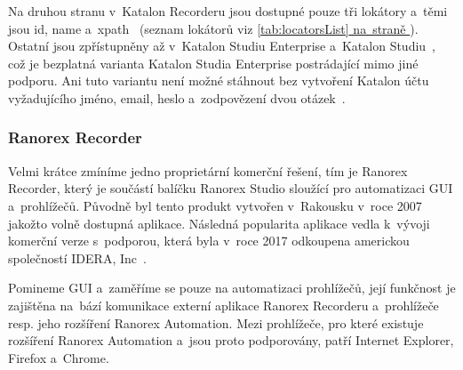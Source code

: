 \documentclass[12pt, a4paper, twoside]{article}
\newcommand{\crefAddedText}[3]{\hyperref[#1]{#2\cref{#1}#3}}
\begin{document}
	Na druhou stranu v~Katalon Recorderu jsou dostupné pouze tři lokátory a~těmi jsou id, name a~xpath~\cite{katalonRecorderVsStudio} (seznam lokátorů viz \crefAddedText{tab:locatorsList}{}{ na~straně \pageref{tab:locatorsList}}). Ostatní jsou zpřístupněny až v~Katalon Studiu Enterprise a~Katalon Studiu~\cite{katalonRecorderVsStudio}, což je bezplatná varianta Katalon Studia Enterprise postrádající mimo jiné podporu. Ani tuto variantu není možné stáhnout bez vytvoření Katalon účtu vyžadujícího jméno, email, heslo a~zodpovězení dvou otázek~\cite{katalonPricing}.
	\newpage
    \subsubsection{Ranorex Recorder}
    Velmi krátce zmíníme jedno proprietární komerční řešení, tím je Ranorex Recorder, který je součástí balíčku Ranorex Studio sloužící pro automatizaci GUI a~prohlížečů. Původně byl tento produkt vytvořen v~Rakousku v~roce 2007 jakožto volně dostupná aplikace. Následná popularita aplikace vedla k~vývoji komerční verze s~podporou, která byla v~roce 2017 odkoupena americkou společností IDERA, Inc~\cite{ranorexAbout}.
    
    Pomineme GUI a~zaměříme se pouze na automatizaci prohlížečů, její funkčnost je zajištěna na~bází komunikace externí aplikace Ranorex Recorderu a~prohlížeče resp. jeho rozšíření Ranorex Automation. Mezi prohlížeče, pro které existuje rozšíření Ranorex Automation a~jsou proto podporovány, patří Internet Explorer, Firefox a~Chrome.
\end{document}
